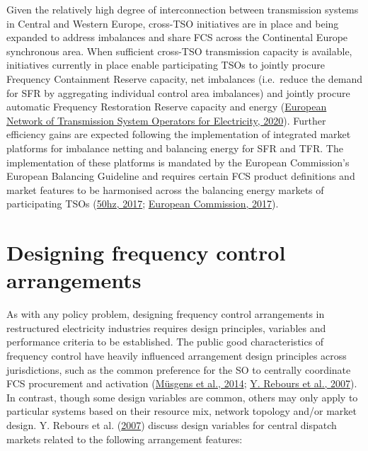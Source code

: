 \documentclass[12pt,a4paper,]{report}
\begin{document}
Given the relatively high degree of interconnection between transmission
systems in Central and Western Europe, cross-TSO initiatives are in
place and being expanded to address imbalances and share FCS across the
Continental Europe synchronous area. When sufficient cross-TSO
transmission capacity is available, initiatives currently in place
enable participating TSOs to jointly procure Frequency Containment
Reserve capacity, net imbalances (i.e.~reduce the demand for SFR by
aggregating individual control area imbalances) and jointly procure
automatic Frequency Restoration Reserve capacity and energy
(\protect\hyperlink{ref-europeannetworkoftransmissionsystemoperatorsforelectricityentso-eENTSOEBalancingReport2020}{European
Network of Transmission System Operators for Electricity, 2020}).
Further efficiency gains are expected following the implementation of
integrated market platforms for imbalance netting and balancing energy
for SFR and TFR. The implementation of these platforms is mandated by
the European Commission's European Balancing Guideline and requires
certain FCS product definitions and market features to be harmonised
across the balancing energy markets of participating TSOs
(\protect\hyperlink{ref-50hzamprionapgeliartetennetConsultationDesignPlatform2017}{50hz,
2017};
\protect\hyperlink{ref-europeancommissionCommissionRegulationEU2017}{European
Commission, 2017}).

\hypertarget{designing-frequency-control-arrangements}{%
\section{Designing frequency control
arrangements}\label{designing-frequency-control-arrangements}}

As with any policy problem, designing frequency control arrangements in
restructured electricity industries requires design principles,
variables and performance criteria to be established. The public good
characteristics of frequency control have heavily influenced arrangement
design principles across jurisdictions, such as the common preference
for the SO to centrally coordinate FCS procurement and activation
(\protect\hyperlink{ref-musgensEconomicsDesignBalancing2014}{Müsgens et
al., 2014};
\protect\hyperlink{ref-reboursFundamentalDesignIssues2007}{Y. Rebours et
al., 2007}). In contrast, though some design variables are common,
others may only apply to particular systems based on their resource mix,
network topology and/or market design. Y. Rebours et al.
(\protect\hyperlink{ref-reboursFundamentalDesignIssues2007}{2007})
discuss design variables for central dispatch markets related to the
following arrangement features:
\end{document}
